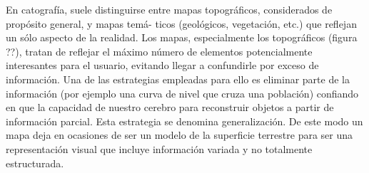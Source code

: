En catografía, suele distinguirse entre mapas topográficos, considerados de propósito general, y mapas temá-
ticos (geológicos, vegetación, etc.) que reflejan un sólo aspecto de la realidad. Los mapas, especialmente los
topográficos (figura ??), tratan de reflejar el máximo número de elementos potencialmente interesantes para el
usuario, evitando llegar a confundirle por exceso de información. Una de las estrategias empleadas para ello
es eliminar parte de la información (por ejemplo una curva de nivel que cruza una población) confiando en
que la capacidad de nuestro cerebro para reconstruir objetos a partir de información parcial. Esta estrategia se
denomina generalización.
De este modo un mapa deja en ocasiones de ser un modelo de la superficie terrestre para ser una representación
visual que incluye información variada y no totalmente estructurada.
